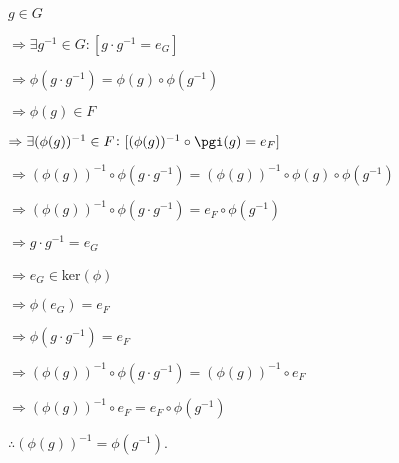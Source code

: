 \documentclass[12pt, a4paper]{article}
\begin{document}
\hspace{2mm} $g\in G$\par
\vspace{2mm}
\hspace{10mm} $\Rightarrow\exists g^{-1}\in G\colon[g\cdot g^{-1}=e_G]$\par
\vspace{2mm}
\hspace{10mm} $\Rightarrow\phi(g\cdot g^{-1})=\phi(g)\circ\phi(g^{-1})$\par
\vspace{2mm}
\hspace{10mm} $\Rightarrow\phi(g)\in F$\par
\vspace{2mm}
\hspace{10mm} $\Rightarrow\exists(\phi(g))^{-1}\in F\colon[(\phi(g))^{-1}\circ\pgi(g)=e_F]$\par
\vspace{2mm}
\hspace{10mm} $\Rightarrow(\phi(g))^{-1}\circ\phi(g\cdot g^{-1})=(\phi(g))^{-1}\circ\phi(g)\circ\phi(g^{-1})$\par
\vspace{2mm}
\hspace{10mm} $\Rightarrow(\phi(g))^{-1}\circ\phi(g\cdot g^{-1})=e_F\circ\phi(g^{-1})$\par
\vspace{2mm}
\hspace{10mm} $\Rightarrow g\cdot g^{-1}=e_G$\par
\vspace{2mm}
\hspace{10mm} $\Rightarrow e_G\in$ker$(\phi)$\par
\vspace{2mm}
\hspace{10mm} $\Rightarrow\phi(e_G)=e_F$\par
\vspace{2mm}
\hspace{10mm} $\Rightarrow\phi(g\cdot g^{-1})=e_F$\par
\vspace{2mm}
\hspace{10mm} $\Rightarrow(\phi(g))^{-1}\circ\phi(g\cdot g^{-1})=(\phi(g))^{-1}\circ e_F$\par
\vspace{2mm}
\hspace{10mm} $\Rightarrow(\phi(g))^{-1}\circ e_F=e_F\circ\phi(g^{-1})$\par
\vspace{2mm}
\hspace{2mm} $\therefore(\phi(g))^{-1}=\phi(g^{-1})$.\par
\vspace{4mm}
    
\end{document}
